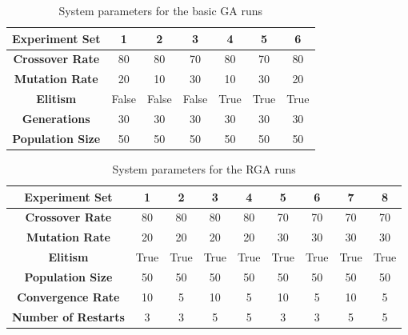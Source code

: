 \begin{table}
	\centering
	\begin{tabular}{ | >{\bfseries}c | c | c | c | c | c | c | }
		\hline
		Experiment Set & 1 & 2 & 3 & 4 & 5 & 6 \\ \hline
		Crossover Rate & 80 & 80 & 70 & 80 & 70 & 80 \\ \hline
		Mutation Rate & 20 & 10 & 30 & 10 & 30 & 20 \\ \hline
		Elitism & False & False & False & True & True & True \\ \hline
		Generations & 30 & 30 & 30 & 30 & 30 & 30 \\ \hline
		Population Size & 50 & 50 & 50 & 50 & 50 & 50 \\ \hline
	\end{tabular}
	\caption{System parameters for the basic GA runs}
	\label{table:viability-ga}
\end{table}

\begin{table}
	\centering
	\begin{tabular}{ | >{\bfseries}c | c | c | c | c | c | c | c | c | }
		\hline
		Experiment Set & 1 & 2 & 3 & 4 & 5 & 6 & 7 & 8 \\ \hline
		Crossover Rate & 80 & 80 & 80 & 80 & 70 & 70 & 70 & 70 \\ \hline
		Mutation Rate & 20 & 20 & 20 & 20 & 30 & 30 & 30 & 30 \\ \hline
		Elitism & True & True & True & True & True & True & True & True \\ \hline
		Population Size & 50 & 50 & 50 & 50 & 50 & 50 & 50 & 50 \\ \hline
		Convergence Rate & 10 & 5 & 10 & 5 & 10 & 5 & 10 & 5 \\ \hline
		Number of Restarts & 3 & 3 & 5 & 5 & 3 & 3 & 5 & 5 \\ \hline
	\end{tabular}
	\caption{System parameters for the RGA runs}
	\label{table:viability-rga}
\end{table}